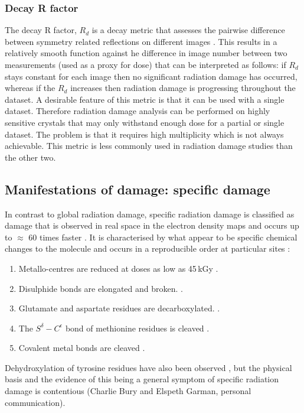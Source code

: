         \subsubsection{Decay R factor}
        \label{subs:Decay R factor}
            The decay R factor, $R_d$ is a decay metric that assesses the pairwise difference between symmetry related reflections on different images \cite{diederichs2006}.
            This results in a relatively smooth function against he difference in image number between two measurements (used as a proxy for dose) that can be interpreted as follows: if $R_d$ stays constant for each image then no significant radiation damage has occurred, whereas if the $R_d$ increases then radiation damage is progressing throughout the dataset.
            A desirable feature of this metric is that it can be used with a single dataset.
            Therefore radiation damage analysis can be performed on highly sensitive crystals that may only withstand enough dose for a partial or single dataset.
			The problem is that it requires high multiplicity which is not always achievable. This metric is less commonly used in radiation damage studies than the other two.

    \subsection{Manifestations of damage: specific damage}
    \label{sub:Manifestations of damage: Specific damage}
        In contrast to global radiation damage, specific radiation damage is classified as damage that is observed in real space in the electron density maps and occurs up to $\approx$ 60 times faster \cite{holton2009}.
        It is characterised by what appear to be specific chemical changes to the molecule and occurs in a reproducible order at particular sites \cite{ravelli2000,weik2000,gerstel2015identifying}:
        \begin{enumerate}
            \item Metallo-centres are reduced at doses as low as 45\,kGy \cite{owen2011revealing}.
            \item Disulphide bonds are elongated and broken. \cite{burmeister2000structural,ravelli2000}.
            \item Glutamate and aspartate residues are decarboxylated. \cite{burmeister2000structural,weik2000,ravelli2000}.
            \item The $S^{\delta}-C^{\epsilon}$ bond of methionine residues is cleaved \cite{burmeister2000structural}.
            \item Covalent metal bonds are cleaved \cite{ramagopal2005radiation}.
        \end{enumerate}
        Dehydroxylation of tyrosine residues have also been observed \cite{burmeister2000structural}, but the physical basis and the evidence of this being a general symptom of specific radiation damage is contentious (Charlie Bury and Elspeth Garman, personal communication).


